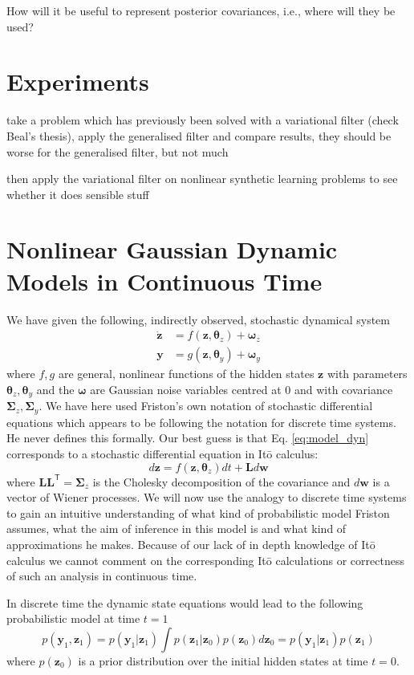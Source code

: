 \documentclass[a4paper,10pt]{article}
\newcommand{\bs}[1]{\mathbf{#1}}					%
\newcommand{\bgs}[1]{\boldsymbol{#1}}				%
\newcommand{\tr}{\mathsf{T}}				%
\newcommand{\eq}[1]{\begin{equation} #1 \end{equation}}%
\renewcommand{\ss}{z}         %
\newcommand{\so}{y}         %
\newcommand{\sn}{\omega} %
\renewcommand{\sp}{\theta}    %
\newcommand{\ps}{\bs{\ss}}    %
\newcommand{\po}{\bs{\so}}    %
\newcommand{\pn}{\bgs{\sn}} %
\newcommand{\pp}{\bgs{\sp}} %
\newcommand{\Cov}{\bgs{\Sigma}}			%
\begin{document}
How will it be useful to represent posterior covariances, i.e., where will they be used? 


\section{Experiments}
take a problem which has previously been solved with a variational filter (check Beal's thesis), apply the generalised filter and compare results, they should be worse for the generalised filter, but not much

then apply the variational filter on nonlinear synthetic learning problems to see whether it does sensible stuff


\section{Nonlinear Gaussian Dynamic Models in Continuous Time}
We have given the following, indirectly observed, stochastic dynamical system
\begin{align}
    \label{eq:model_dyn}\dot{\ps} &= f(\ps, \pp_{\ss}) + \pn_{\ss}\\
    \po &= g(\ps, \pp_{\so}) + \pn_{\so}
\end{align}
where $f, g$ are general, nonlinear functions of the hidden states $\ps$ with parameters $\pp_{\ss}, \pp_{\so}$ and the $\pn$ are Gaussian noise variables centred at 0 and with covariance $\Cov_{\ss}, \Cov_{\so}$. We have here used Friston's own notation of stochastic differential equations which appears to be following the notation for discrete time systems. He never defines this formally. Our best guess is that Eq. \ref{eq:model_dyn} corresponds to a stochastic differential equation in It\={o} calculus:
\[
    d\ps = f(\ps, \pp_{\ss})dt + \bs{L}d\bs{w}
\]
where $\bs{L}\bs{L}^\tr = \Cov_{\ss}$ is the Cholesky decomposition of the covariance and $d\bs{w}$ is a vector of Wiener processes. We will now use the analogy to discrete time systems to gain an intuitive understanding of what kind of probabilistic model Friston assumes, what the aim of inference in this model is and what kind of approximations he makes. Because of our lack of in depth knowledge of It\={o} calculus we cannot comment on the corresponding It\={o} calculations or correctness of such an analysis in continuous time.

In discrete time the dynamic state equations would lead to the following probabilistic model at time $t=1$
\eq{
    p(\po_1, \ps_1) = p(\po_1| \ps_1)\int p(\ps_1|\ps_0)p(\ps_0) d\ps_0 = p(\po_1| \ps_1)p(\ps_1)
}
where $p(\ps_0)$ is a prior distribution over the initial hidden states at time $t=0$.
\end{document}
